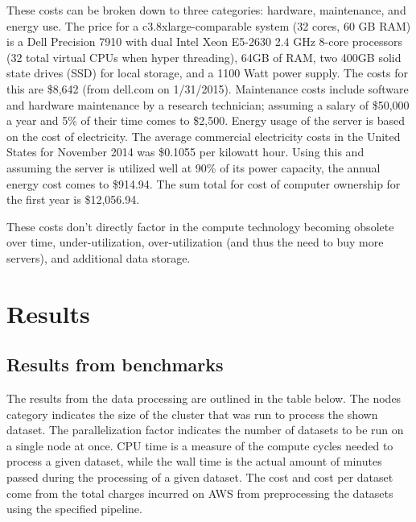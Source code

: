 \documentclass{frontiersSCNS} %
\begin{document}
These costs can be broken down to three categories: hardware, maintenance, and energy use. The price for a c3.8xlarge-comparable system (32 cores, 60 GB RAM) is a Dell Precision 7910 with dual Intel Xeon E5-2630 2.4 GHz 8-core processors (32 total virtual CPUs when hyper threading), 64GB of RAM, two 400GB solid state drives (SSD) for local storage, and a 1100 Watt power supply. The costs for this are \$8,642 (from dell.com on 1/31/2015). Maintenance costs include software and hardware maintenance by a research technician; assuming a salary of \$50,000 a year and 5\% of their time comes to \$2,500. Energy usage of the server is based on the cost of electricity. The average commercial electricity costs in the United States for November 2014 was \$0.1055 per kilowatt hour. Using this and assuming the server is utilized well at 90\% of its power capacity, the annual energy cost comes to \$914.94. The sum total for cost of computer ownership for the first year is \$12,056.94.


These costs don’t directly factor in the compute technology becoming obsolete over time, under-utilization, over-utilization (and thus the need to buy more servers), and additional data storage.

\section{Results}

\subsection{Results from benchmarks}
The results from the data processing are outlined in the table below. The nodes category indicates the size of the cluster that was run to process the shown dataset. The parallelization factor indicates the number of datasets to be run on a single node at once. CPU time is a measure of the compute cycles needed to process a given dataset, while the wall time is the actual amount of minutes passed during the processing of a given dataset. The cost and cost per dataset come from the total charges incurred on AWS from preprocessing the datasets using the specified pipeline.
\end{document}
